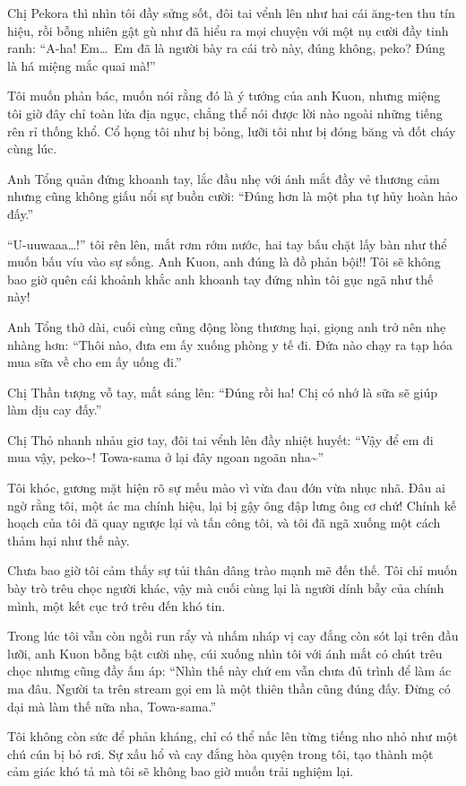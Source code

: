 \documentclass[../main.tex]{subfiles}
\begin{document}
Chị Pekora thì nhìn tôi đầy sửng sốt, đôi tai vểnh lên như hai cái ăng-ten thu tín hiệu, rồi bỗng nhiên gật gù như đã hiểu ra mọi chuyện với một nụ cười đầy tinh ranh: ``A-ha! Em\dots\ Em đã là người bày ra cái trò này, đúng không, peko? Đúng là há miệng mắc quai mà!''

Tôi muốn phản bác, muốn nói rằng đó là ý tưởng của anh Kuon, nhưng miệng tôi giờ đây chỉ toàn lửa địa ngục, chẳng thể nói được lời nào ngoài những tiếng rên rỉ thống khổ. Cổ họng tôi như bị bỏng, lưỡi tôi như bị đóng băng và đốt cháy cùng lúc.

Anh Tổng quản đứng khoanh tay, lắc đầu nhẹ với ánh mắt đầy vẻ thương cảm nhưng cũng không giấu nổi sự buồn cười: ``Đúng hơn là một pha tự hủy hoàn hảo đấy.''

``U-uuwaaa\dots!'' tôi rên lên, mắt rơm rớm nước, hai tay bấu chặt lấy bàn như thể muốn bấu víu vào sự sống. Anh Kuon, anh đúng là đồ phản bội!! Tôi sẽ không bao giờ quên cái khoảnh khắc anh khoanh tay đứng nhìn tôi gục ngã như thế này!

Anh Tổng thở dài, cuối cùng cũng động lòng thương hại, giọng anh trở nên nhẹ nhàng hơn: ``Thôi nào, đưa em ấy xuống phòng y tế đi. Đứa nào chạy ra tạp hóa mua sữa về cho em ấy uống đi.''

Chị Thần tượng vỗ tay, mắt sáng lên: ``Đúng rồi ha! Chị có nhớ là sữa sẽ giúp làm dịu cay đấy.''

Chị Thỏ nhanh nhảu giơ tay, đôi tai vểnh lên đầy nhiệt huyết: ``Vậy để em đi mua vậy, peko\~{}! Towa-sama ở lại đây ngoan ngoãn nha\~{}''

Tôi khóc, gương mặt hiện rõ sự mếu mào vì vừa đau đớn vừa nhục nhã. Đâu ai ngờ rằng tôi, một ác ma chính hiệu, lại bị gậy ông đập lưng ông cơ chứ! Chính kế hoạch của tôi đã quay ngược lại và tấn công tôi, và tôi đã ngã xuống một cách thảm hại như thế này.

Chưa bao giờ tôi cảm thấy sự tủi thân dâng trào mạnh mẽ đến thế. Tôi chỉ muốn bày trò trêu chọc người khác, vậy mà cuối cùng lại là người dính bẫy của chính mình, một kết cục trớ trêu đến khó tin.

Trong lúc tôi vẫn còn ngồi run rẩy và nhấm nháp vị cay đắng còn sót lại trên đầu lưỡi, anh Kuon bỗng bật cười nhẹ, cúi xuống nhìn tôi với ánh mắt có chút trêu chọc nhưng cũng đầy ấm áp: ``Nhìn thế này chứ em vẫn chưa đủ trình để làm ác ma đâu. Người ta trên stream gọi em là một thiên thần cũng đúng đấy. Đừng có dại mà làm thế nữa nha, Towa-sama.''

Tôi không còn sức để phản kháng, chỉ có thể nấc lên từng tiếng nho nhỏ như một chú cún bị bỏ rơi. Sự xấu hổ và cay đắng hòa quyện trong tôi, tạo thành một cảm giác khó tả mà tôi sẽ không bao giờ muốn trải nghiệm lại.
\end{document}
